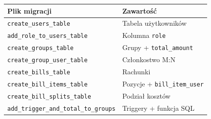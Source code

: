 \documentclass[12pt,a4paper]{report}
\begin{document}
\begin{table}[H]
\centering
\small
\begin{tabular}{@{}p{7cm}p{6cm}@{}}
\toprule
\textbf{Plik migracji} & \textbf{Zawarto\'s\'c} \\
\midrule
\texttt{create\_users\_table} & Tabela u\.zytkownik\'ow \\
\texttt{add\_role\_to\_users\_table} & Kolumna \texttt{role} \\
\texttt{create\_groups\_table} & Grupy + \texttt{total\_amount} \\
\texttt{create\_group\_user\_table} & Cz\l{}onkostwo M:N \\
\texttt{create\_bills\_table} & Rachunki \\
\texttt{create\_bill\_items\_table} & Pozycje + \texttt{bill\_item\_user} \\
\texttt{create\_bill\_splits\_table} & Podzia\l{} koszt\'ow \\
\texttt{add\_trigger\_and\_total\_to\_groups} & Triggery + funkcja SQL \\
\bottomrule
\end{tabular}
\end{table}
\end{document}

